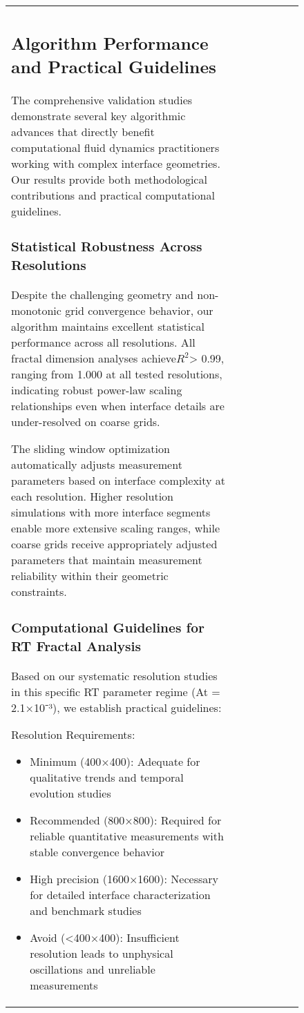 \documentclass[preprint,12pt]{elsarticle}
\def\textbf#1{#1}%
\begin{document}
\begin{figure}[ht]
\begin{table}[ht]
\begin{tabular}{|l|c|c|c|c|c|c|}
\begin{table}[H]
\subsection{Algorithm Performance and Practical Guidelines}
\label{subsec:practical_impact}

The comprehensive validation studies demonstrate several key algorithmic advances that directly benefit computational fluid dynamics practitioners working with complex interface geometries. Our results provide both methodological contributions and practical computational guidelines.

\subsubsection{Statistical Robustness Across Resolutions}

Despite the challenging geometry and non-monotonic grid convergence behavior, our algorithm maintains excellent statistical performance across all resolutions. All fractal dimension analyses achieve$R^2$> 0.99, ranging from 1.000 at all tested resolutions, indicating robust power-law scaling relationships even when interface details are under-resolved on coarse grids.

The sliding window optimization automatically adjusts measurement parameters based on interface complexity at each resolution. Higher resolution simulations with more interface segments enable more extensive scaling ranges, while coarse grids receive appropriately adjusted parameters that maintain measurement reliability within their geometric constraints.

\subsubsection{Computational Guidelines for RT Fractal Analysis}

Based on our systematic resolution studies in this specific RT parameter regime (At = 2.1×10⁻³), we establish practical guidelines:

\textbf{Resolution Requirements}:
\begin{itemize}
\item \textbf{Minimum (400×400)}: Adequate for qualitative trends and temporal evolution studies
\item \textbf{Recommended (800×800)}: Required for reliable quantitative measurements with stable convergence behavior
\item \textbf{High precision (1600×1600)}: Necessary for detailed interface characterization and benchmark studies
\item \textbf{Avoid (<400×400)}: Insufficient resolution leads to unphysical oscillations and unreliable measurements
\end{itemize}


\end{table}
\end{tabular}
\end{table}
\end{figure}
\end{document}
